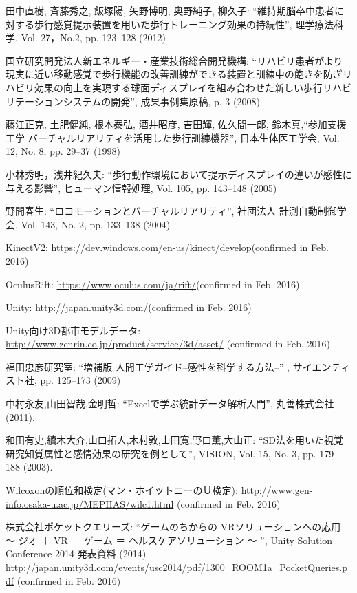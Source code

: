 \begin{thebibliography}{20}
田中直樹, 斉藤秀之, 飯塚陽, 矢野博明, 奥野純子, 柳久子: ``維持期脳卒中患者に対する歩行感覚提示装置を用いた歩行トレーニング効果の持続性'', 理学療法科学, Vol. 27，No.2, pp. 123--128 (2012)

国立研究開発法人新エネルギー・産業技術総合開発機構: ``リハビリ患者がより現実に近い移動感覚で歩行機能の改善訓練ができる装置と訓練中の飽きを防ぎリハビリ効果の向上を実現する球面ディスプレイを組み合わせた新しい歩行リハビリテーションシステムの開発'', 成果事例集原稿, p. 3 (2008)

藤江正克, 土肥健純, 根本泰弘, 酒井昭彦, 吉田輝, 佐久間一郎, 鈴木真,``参加支援工学 バーチャルリアリティを活用した歩行訓練機器'', 日本生体医工学会, Vol. 12, No. 8, pp. 29--37 (1998) 

小林秀明，浅井紀久夫: ``歩行動作環境において提示ディスプレイの違いが感性に与える影響'', ヒューマン情報処理, Vol. 105, pp. 143--148 (2005)

野間春生: ``ロコモーションとバーチャルリアリティ'', 社団法人 計測自動制御学会, Vol. 143, No. 2, pp. 133--138 (2004)

KinectV2: \url{https://dev.windows.com/en-us/kinect/develop}(confirmed in Feb. 2016)

OculusRift: \url{https://www.oculus.com/ja/rift/}(confirmed in Feb. 2016)

Unity: \url{http://japan.unity3d.com/}(confirmed in Feb. 2016)

Unity向け3D都市モデルデータ: \url{http://www.zenrin.co.jp/product/service/3d/asset/} (confirmed in Feb. 2016)

福田忠彦研究室: ``増補版 人間工学ガイド--感性を科学する方法--'' , サイエンティスト社, pp. 125--173 (2009)

中村永友,山田智哉,金明哲: ``Excelで学ぶ統計データ解析入門'', 丸善株式会社 (2011).

和田有史,續木大介,山口拓人,木村敦,山田寛,野口薫,大山正: ``SD法を用いた視覚研究知覚属性と感情効果の研究を例として'', VISION, Vol. 15, No. 3, pp. 179--188 (2003).

Wilcoxonの順位和検定(マン・ホイットニーのＵ検定): \url{ http://www.gen-info.osaka-u.ac.jp/MEPHAS/wilc1.html} (confirmed in Feb. 2016)

株式会社ポケットクエリーズ: ``ゲームのちからの VRソリューションへの応用 〜 ジオ ＋ VR ＋ ゲーム ＝ ヘルスケアソリューション 〜	'', Unity Solution Conference 2014 発表資料 (2014)
\url{http://japan.unity3d.com/events/usc2014/pdf/1300_ROOM1a_PocketQueries.pdf} (confirmed in Feb. 2016)
\fi

\end{thebibliography}
\hspace{15pt}